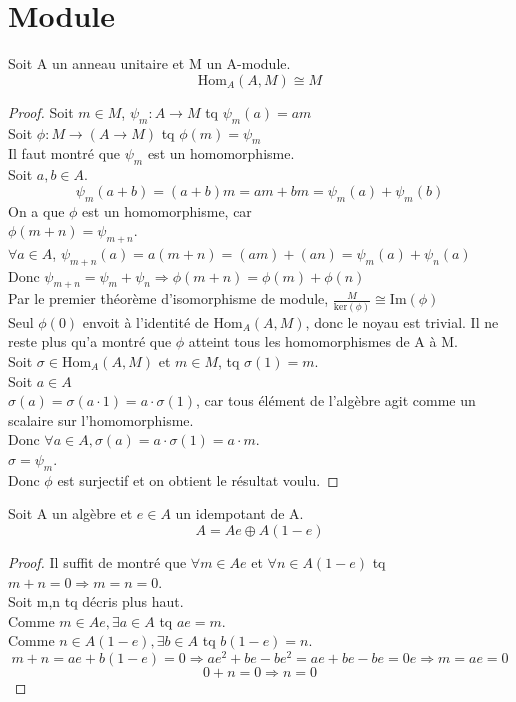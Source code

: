\chapter{Module}

\begin{lemma}[HomAMisoM]
    \label{HomAMisoM}
    Soit A un anneau unitaire et M un A-module.
    \[ \text{Hom}_{A}(A,M) \cong M \]
\end{lemma}
\begin{proof}
    Soit $m \in M$, $\psi_{m} : A \to M$ tq $\psi_{m}(a) = a m$\\
    Soit $\phi : M \to (A \to M)$ tq $\phi(m) = \psi_{m}$\\
    Il faut montré que $\psi_{m}$ est un homomorphisme.\\
    Soit $a,b \in A$.\\
    \[ \psi_{m}(a+b) = (a+b)m = a m + b m = \psi_{m}(a) + \psi_{m}(b) \]
    On a que $\phi$ est un homomorphisme, car\\
    $\phi(m+n) = \psi_{m+n}$.\\
    $\forall a \in A$, $\psi_{m+n}(a) = a (m+n) = (a m) + (a n) = \psi_{m}(a)+\psi_{n}(a)$\\
    Donc $\psi_{m+n} = \psi_{m}+\psi_{n} \Rightarrow \phi(m+n) = \phi(m)+\phi(n)$\\
    Par le premier théorème d'isomorphisme de module, $\frac{M}{\text{ker}(\phi)} \cong \text{Im}(\phi)$\\
    Seul $\phi(0)$ envoit à l'identité de $\text{Hom}_{A}(A,M)$, donc le noyau est trivial. Il ne reste plus qu'a montré que $\phi$ atteint tous les homomorphismes de A à M.\\
    Soit $\sigma \in \text{Hom}_{A}(A,M)$ et $m \in M$, tq $\sigma(1)=m$.\\
    Soit $a \in A$\\
    $\sigma(a) = \sigma(a \cdot 1) = a \cdot \sigma(1)$, car tous élément de l'algèbre agit comme un scalaire sur l'homomorphisme.\\
    Donc $\forall a \in A, \sigma(a) = a \cdot \sigma(1) = a\cdot m$.\\
    $\sigma = \psi_{m}$.\\
    Donc $\phi$ est surjectif et on obtient le résultat voulu.
\end{proof}

\begin{lemma}[MdirectSumIdemp]
    \label{MdirectSumIdemp}
    Soit A un algèbre et $e \in A$ un idempotant de A.
    \[ A = A e \oplus A (1-e) \]
\end{lemma}
\begin{proof}
    Il suffit de montré que
    $\forall m \in A e$ et $\forall n \in A (1-e)$ tq $m+n=0 \Rightarrow m=n=0$.\\
    Soit m,n tq décris plus haut.\\
    Comme $m \in A e, \exists a \in A$ tq $a e = m$.\\
    Comme $n \in A (1-e), \exists b \in A$ tq $b (1-e) = n$.\\
    \[ m+n=a e + b (1-e) = 0 \Rightarrow a e^{2} + b e - b e^{2} = a e + b e - b e = 0 e \Rightarrow m = a e = 0 \]
    \[ 0+n=0 \Rightarrow n=0\]
\end{proof}

